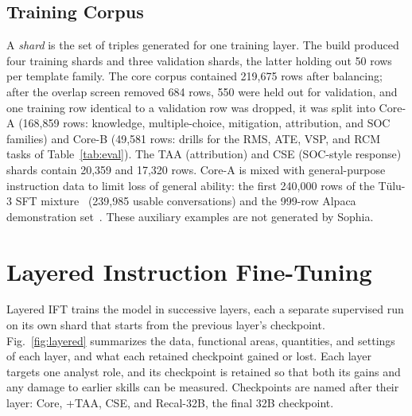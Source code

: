 \documentclass[conference]{IEEEtran}
\begin{document}
\subsection{Training Corpus}
A \emph{shard} is the set of triples generated for one training layer. The build produced four training shards and three validation shards, the latter holding out 50 rows per template family. The core corpus contained 219,675 rows after balancing; after the overlap screen removed 684 rows, 550 were held out for validation, and one training row identical to a validation row was dropped, it was split into Core-A (168,859 rows: knowledge, multiple-choice, mitigation, attribution, and SOC families) and Core-B (49,581 rows: drills for the RMS, ATE, VSP, and RCM tasks of Table~\ref{tab:eval}). The TAA (attribution) and CSE (SOC-style response) shards contain 20,359 and 17,320 rows. Core-A is mixed with general-purpose instruction data to limit loss of general ability: the first 240,000 rows of the T\"ulu-3 SFT mixture~\cite{lambert2024tulu} (239,985 usable conversations) and the 999-row Alpaca demonstration set~\cite{taori2023alpaca}. These auxiliary examples are not generated by Sophia.

\section{Layered Instruction Fine-Tuning}\label{sec:layered}
Layered IFT trains the model in successive layers, each a separate supervised run on its own shard that starts from the previous layer's checkpoint. Fig.~\ref{fig:layered} summarizes the data, functional areas, quantities, and settings of each layer, and what each retained checkpoint gained or lost. Each layer targets one analyst role, and its checkpoint is retained so that both its gains and any damage to earlier skills can be measured. Checkpoints are named after their layer: Core, +TAA, CSE, and Recal-32B, the final 32B checkpoint.
\end{document}
